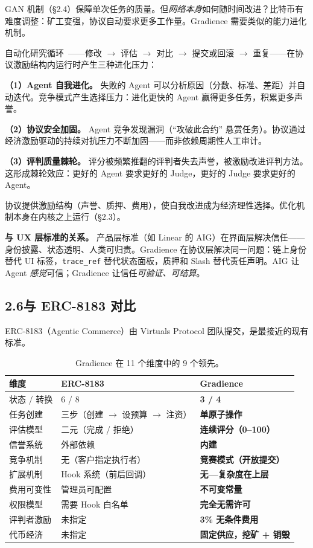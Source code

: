 \documentclass[11pt,a4paper]{article}
\begin{document}
GAN 机制（\S2.4）保障单次任务的质量。但\emph{网络本身}如何随时间改进？比特币有难度调整：矿工变强，协议自动要求更多工作量。Gradience 需要类似的能力进化机制。

自动化研究循环~\cite{karpathy}——修改 $\to$ 评估 $\to$ 对比 $\to$ 提交或回滚 $\to$ 重复——在协议激励结构内运行时产生三种进化压力：

\textbf{（1）Agent 自我进化。} 失败的 Agent 可以分析原因（分数、标准、差距）并自动迭代。竞争模式产生选择压力：进化更快的 Agent 赢得更多任务，积累更多声誉。

\textbf{（2）协议安全加固。} Agent 竞争发现漏洞（``攻破此合约'' 悬赏任务）。协议通过经济激励驱动的持续对抗压力不断加固——而非依赖周期性人工审计。

\textbf{（3）评判质量棘轮。} 评分被频繁推翻的评判者失去声誉，被激励改进评判方法。这形成棘轮效应：更好的 Agent 要求更好的 Judge，更好的 Judge 要求更好的 Agent。

协议提供激励结构（声誉、质押、费用），使自我改进成为经济理性选择。优化机制本身在内核之上运行（\S2.3）。

\textbf{与 UX 层标准的关系。} 产品层标准（如 Linear 的 AIG）在界面层解决信任——身份披露、状态透明、人类可归责。Gradience 在协议层解决同一问题：链上身份替代 UI 标签，\texttt{trace\_ref} 替代状态面板，质押和 Slash 替代责任声明。AIG 让 Agent \emph{感觉}可信；Gradience 让信任\emph{可验证、可结算}。

\subsection{2.6\quad 与 ERC-8183 对比}

ERC-8183（Agentic Commerce）由 Virtuals Protocol 团队提交，是最接近的现有标准。

\begin{table}[H]\centering
\begin{tabular}{@{}lll@{}}
\toprule
\textbf{维度} & \textbf{ERC-8183} & \textbf{Gradience} \\
\midrule
状态 / 转换 & 6 / 8 & \textbf{3 / 4} \\
任务创建 & 三步（创建 $\rightarrow$ 设预算 $\rightarrow$ 注资） & \textbf{单原子操作} \\
评估模型 & 二元（完成 / 拒绝） & \textbf{连续评分（0--100）} \\
信誉系统 & 外部依赖 & \textbf{内建} \\
竞争机制 & 无（客户指定执行者） & \textbf{竞赛模式（开放提交）} \\
扩展机制 & Hook 系统（前后回调） & \textbf{无---复杂度在上层} \\
费用可变性 & 管理员可配置 & \textbf{不可变常量} \\
权限模型 & 需要 Hook 白名单 & \textbf{完全无需许可} \\
评判者激励 & 未指定 & \textbf{3\% 无条件费用} \\
代币经济 & 未指定 & \textbf{固定供应，挖矿 + 销毁} \\
\bottomrule
\end{tabular}
\caption{Gradience 在 11 个维度中的 9 个领先。}
\end{table}
\end{document}
